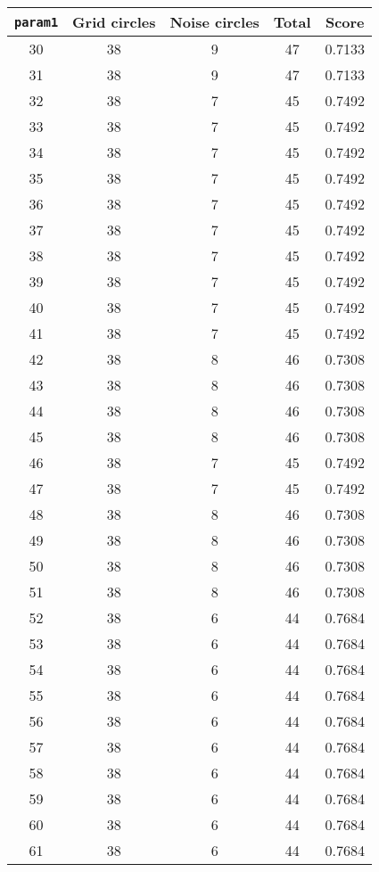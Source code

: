 \documentclass[letterpaper, 12pt]{article}
\begin{document}
\begin{longtable}{|c|c|c|c|c|}
\hline
\textbf{\texttt{param1}} & \textbf{Grid circles} & \textbf{Noise circles} & \textbf{Total} & \textbf{Score} \\
\hline
30 & 38 & 9 & 47 & 0.7133 \\
\hline
31 & 38 & 9 & 47 & 0.7133 \\
\hline
32 & 38 & 7 & 45 & 0.7492 \\
\hline
33 & 38 & 7 & 45 & 0.7492 \\
\hline
34 & 38 & 7 & 45 & 0.7492 \\
\hline
35 & 38 & 7 & 45 & 0.7492 \\
\hline
36 & 38 & 7 & 45 & 0.7492 \\
\hline
37 & 38 & 7 & 45 & 0.7492 \\
\hline
38 & 38 & 7 & 45 & 0.7492 \\
\hline
39 & 38 & 7 & 45 & 0.7492 \\
\hline
40 & 38 & 7 & 45 & 0.7492 \\
\hline
41 & 38 & 7 & 45 & 0.7492 \\
\hline
42 & 38 & 8 & 46 & 0.7308 \\
\hline
43 & 38 & 8 & 46 & 0.7308 \\
\hline
44 & 38 & 8 & 46 & 0.7308 \\
\hline
45 & 38 & 8 & 46 & 0.7308 \\
\hline
46 & 38 & 7 & 45 & 0.7492 \\
\hline
47 & 38 & 7 & 45 & 0.7492 \\
\hline
48 & 38 & 8 & 46 & 0.7308 \\
\hline
49 & 38 & 8 & 46 & 0.7308 \\
\hline
50 & 38 & 8 & 46 & 0.7308 \\
\hline
51 & 38 & 8 & 46 & 0.7308 \\
\hline
52 & 38 & 6 & 44 & 0.7684 \\
\hline
53 & 38 & 6 & 44 & 0.7684 \\
\hline
54 & 38 & 6 & 44 & 0.7684 \\
\hline
55 & 38 & 6 & 44 & 0.7684 \\
\hline
56 & 38 & 6 & 44 & 0.7684 \\
\hline
57 & 38 & 6 & 44 & 0.7684 \\
\hline
58 & 38 & 6 & 44 & 0.7684 \\
\hline
59 & 38 & 6 & 44 & 0.7684 \\
\hline
60 & 38 & 6 & 44 & 0.7684 \\
\hline
61 & 38 & 6 & 44 & 0.7684 \\

\end{longtable}
\end{document}
